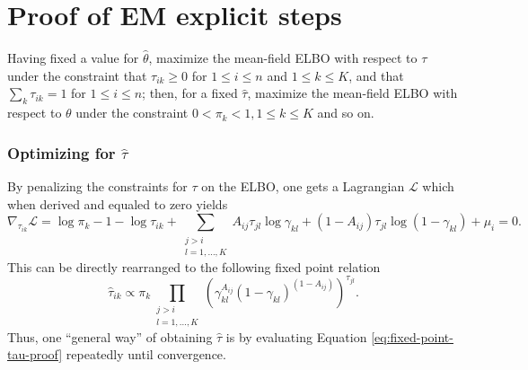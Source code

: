 \documentclass[../../main.tex]{subfiles} %
\begin{document}
	
\section{Proof of EM explicit steps} \label{proof:em-steps}

Having fixed a value for \(\hat \theta\), maximize the mean-field ELBO 
with respect to \(\tau\) under the constraint that \(\tau_{ik} \geq 0\) for \(1 
\leq i \leq n\) and \(1 \leq k \leq K\), and that \(\sum_k \tau_{ik} = 1\) for 
\(1 \leq i \leq n\); then, for a fixed \(\hat \tau\), maximize the mean-field 
ELBO with respect to \(\theta\) under the constraint \(0 < \pi_k < 1, 1 \leq k 
\leq K \) and so on. 

\subsubsection{Optimizing for \(\hat \tau \)} By penalizing the constraints for
\(\tau\) on the ELBO, one gets a Lagrangian \(\mathscr L\) which when derived 
and equaled to zero yields
\begin{dmath*}
	\nabla_{\tau_{ik}} \mathscr L = \log{\pi_k} - 1 - \log{\tau_{ik}} +
	\sum_{\substack{j > i \\ l = 1, \dots, K}} A_{ij} \tau_{jl}
	\log{\gamma_{kl}} + \left( 1 - A_{ij} \right) \tau_{jl} \log{\left( 1 -
		\gamma_{kl}
		\right)} + \mu_i = 0.
\end{dmath*}
This can be directly rearranged to the following fixed point relation
\begin{equation}
	\hat \tau_{ik} \propto \pi_k \prod_{\substack{j > i \\ l = 1, \dots, K}}
	\left( \gamma_{kl}^{A_{ij}} \left( 1 - \gamma_{kl} \right)^{\left( 1 -
		A_{ij}
		\right)} \right)^{\tau_{jl}}.
	\label{eq:fixed-point-tau-proof}
\end{equation}
Thus, one ``general way'' of obtaining \(\hat \tau\) is by evaluating Equation
\eqref{eq:fixed-point-tau-proof} repeatedly until convergence.
\end{document}
